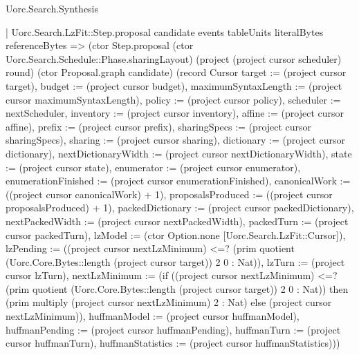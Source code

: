\begin{lexlean}{Uorc.Search.Synthesis}
\begin{semanticmodule}
{      | Uorc.Search.LzFit::Step.proposal candidate events tableUnits literalBytes referenceBytes => (ctor Step.proposal (ctor Uorc.Search.Schedule::Phase.sharingLayout) (project (project cursor scheduler) round) (ctor Proposal.graph candidate) (record Cursor {target := (project cursor target), budget := (project cursor budget), maximumSyntaxLength := (project cursor maximumSyntaxLength), policy := (project cursor policy), scheduler := nextScheduler, inventory := (project cursor inventory), affine := (project cursor affine), prefix := (project cursor prefix), sharingSpecs := (project cursor sharingSpecs), sharing := (project cursor sharing), dictionary := (project cursor dictionary), nextDictionaryWidth := (project cursor nextDictionaryWidth), state := (project cursor state), enumerator := (project cursor enumerator), enumerationFinished := (project cursor enumerationFinished), canonicalWork := ((project cursor canonicalWork) + 1), proposalsProduced := ((project cursor proposalsProduced) + 1), packedDictionary := (project cursor packedDictionary), nextPackedWidth := (project cursor nextPackedWidth), packedTurn := (project cursor packedTurn), lzModel := (ctor Option.none [Uorc.Search.LzFit::Cursor]), lzPending := ((project cursor nextLzMinimum) <=? (prim quotient (Uorc.Core.Bytes::length (project cursor target)) 2 0 : Nat)), lzTurn := (project cursor lzTurn), nextLzMinimum := (if ((project cursor nextLzMinimum) <=? (prim quotient (Uorc.Core.Bytes::length (project cursor target)) 2 0 : Nat)) then (prim multiply (project cursor nextLzMinimum) 2 : Nat) else (project cursor nextLzMinimum)), huffmanModel := (project cursor huffmanModel), huffmanPending := (project cursor huffmanPending), huffmanTurn := (project cursor huffmanTurn), huffmanStatistics := (project cursor huffmanStatistics)}))
}
\end{semanticmodule}
\end{lexlean}
